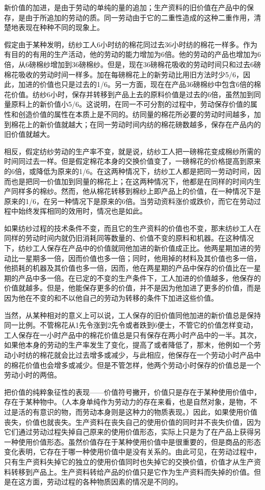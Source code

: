 \documentclass{ctexbook}
\begin{document}
新价值的加进，是由于劳动的单纯的量的追加；生产资料的旧价值在产品中的保存，是由于所追加的劳动的质。同一劳动由于它的二重性造成的这种二重作用，清楚地表现在种种不同的现象上。

假定由于某种发明，纺纱工人6小时纺的棉花同过去36小时纺的棉花一样多。作为有目的的有用的生产活动，他的劳动的能力增加为6倍。他的劳动的产品也增加为6倍，从6磅棉纱增加到36磅棉纱。但是，现在36磅棉花吸收的劳动时间只和过去6磅棉花吸收的劳动时间一样多。加在每磅棉花上的新劳动比用旧方法时少5/6，因此，加进的价值也只是过去的1/6。另一方面，现在在产品36磅棉纱中包含6倍的棉花价值。纺纱6小时，保存并转移到产品上去的原料价值是过去的6倍，虽然加到同量原料上的新价值小5/6。这说明，在同一不可分割的过程中，劳动保存价值的属性和创造价值的属性在本质上是不同的。纺同量的棉花所必要的劳动时间越多，加到棉花上的新价值就越大；在同一劳动时间内纺的棉花磅数越多，保存在产品内的旧价值就越大。

相反，假定纺纱劳动的生产率不变，就是说，纺纱工人把一磅棉花变成棉纱所需的时间同过去一样。但是假定棉花本身的交换价值变了，一磅棉花的价格提高到原来的6倍，或降低为原来的1/6。在这两种情况下，纺纱工人都是把同一劳动时间，因而也是把同一价值加到同量的棉花上；在这两种情况下，他都是在同样的时间内生产同样多的棉纱。然而，他从棉花转移到棉纱上即产品上的价值，在一种情况下是原来的1/6，在另一种情况下是原来的6倍。当劳动资料涨价或跌价，而它在劳动过程中始终发挥相同的效用时，情况也是如此。

如果纺纱过程的技术条件不变，而且它的生产资料的价值也不变，那末纺纱工人在同样的劳动时间内就仍旧消耗同等数量的、价值不变的原料和机器。在这种情况下，纺纱工人保存在产品中的价值就同他加进的新价值成正比。他两星期加进的劳动比一星期多一倍，因而价值也多一倍；同时，他用掉的材料及其价值也多一倍，他损耗的机器及其价值也多一倍，因而，他在两星期的产品中保存的价值比在一星期的产品中多一倍。在已定的不变的生产条件下，工人加进的价值越多，他保存的价值就越多。但是，他能保存更多的价值，并不是因为他加进了更多的价值，而是因为他在不变的和不以他自己的劳动为转移的条件下加进这些价值。

当然，从某种相对的意义上可以说，工人保存的旧价值同他加进的新价值总是保持同一比例。不管棉花从1先令涨到2先令或者跌到6便士，不管它的价值怎样变动，工人保存在一小时产品中的棉花价值总是只有保存在两小时产品中的一半。其次，如果他本身的劳动的生产率发生了变化，提高了或者降低了，那末，他例如一个劳动小时纺的棉花就会比过去增多或减少，与此相应，他保存在一个劳动小时产品中的棉花价值也会增多或减少。但是不管怎样，他两个劳动小时保存的价值总是一个劳动小时的两倍。

把价值的纯粹象征性的表现——价值符号撇开，价值只是存在于某种使用价值中，存在于某种物中。（人本身单纯作为劳动力的存在来看，也是自然对象，是物，不过是活的有意识的物，而劳动本身则是这种力的物质表现。）因此，如果使用价值丧失，价值也就丧失。生产资料在丧失自己的使用价值的同时并不丧失价值，因为它们通过劳动过程失掉自己原来的使用价值形态，实际上只是为了在产品上获得另一种使用价值形态。虽然价值存在于某种使用价值中是很重要的，但是商品的形态变化表明，它存在于哪一种使用价值中是没有关系的。由此可见，在劳动过程中，只有生产资料失掉它的独立的使用价值同时也失掉它的交换价值，价值才从生产资料转移到产品上。生产资料转给产品的价值只是它作为生产资料而失掉的价值。但是在这方面，劳动过程的各种物质因素的情况是不同的。
\end{document}
